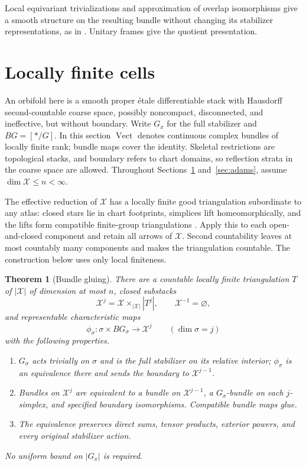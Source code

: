 \documentclass[11pt,a4paper,reqno]{amsart}
\numberwithin{equation}{section}
\newtheorem{theorem}{Theorem}[section]
\theoremstyle{remark}
\theoremstyle{plain}
\newcommand{\X}{\mathcal X}
\newcommand{\Vect}{\operatorname{Vect}}
\begin{document}
Local equivariant trivializations and approximation of overlap isomorphisms
give a smooth structure on the resulting bundle without changing its stabilizer
representations, as in \cite[proof of Corollary~1.3]{Pardon}. Unitary frames
give the quotient presentation.

\section{Locally finite cells}\label{sec:cells}

An orbifold here is a smooth proper \'etale differentiable stack with
Hausdorff second-countable coarse space, possibly noncompact, disconnected,
and ineffective, but without boundary. Write $G_x$ for the full stabilizer
and $BG=[*/G]$. In this section $\Vect$ denotes continuous complex bundles of
locally finite rank; bundle maps cover the identity. Skeletal restrictions
are topological stacks, and boundary refers to chart domains, so reflection
strata in the coarse space are allowed.
Throughout Sections~\ref{sec:cells} and~\ref{sec:adams}, assume
$\dim\X\leq n<\infty$.

The effective reduction of $\X$ has a locally finite good triangulation
subordinate to any atlas: closed stars lie in chart footprints, simplices
lift homeomorphically, and the lifts form compatible finite-group
triangulations \cite[Proposition 1.2.3 and Lemmas 1.2.2, 1.2.4]{MP}. Apply
this to each open-and-closed component and retain all arrows of $\X$.
Second countability leaves at most countably many components and makes the
triangulation countable. The construction below uses only local finiteness.

\begin{theorem}[Bundle gluing]\label{thm:cells}
There are a countable locally finite triangulation $T$ of $|\X|$ of
dimension at most $n$, closed substacks
\[
 \X^j=\X\mathbin{\times}_{|\X|}|T^j|,\qquad \X^{-1}=\varnothing,
\]
and representable characteristic maps
\[
 \phi_\sigma:\sigma\times BG_\sigma\longrightarrow\X^j
 \qquad(\dim\sigma=j)
\]
with the following properties.
\begin{enumerate}[label=(\roman*)]
\item $G_\sigma$ acts trivially on $\sigma$ and is the full stabilizer on its
relative interior; $\phi_\sigma$ is an equivalence there and sends the
boundary to $\X^{j-1}$.
\item Bundles on $\X^j$ are equivalent to a bundle on $\X^{j-1}$, a
$G_\sigma$-bundle on each $j$-simplex, and specified boundary
isomorphisms. Compatible bundle maps glue.
\item The equivalence preserves direct sums, tensor products, exterior
powers, and every original stabilizer action.
\end{enumerate}
No uniform bound on $|G_x|$ is required.
\end{theorem}
\end{document}
